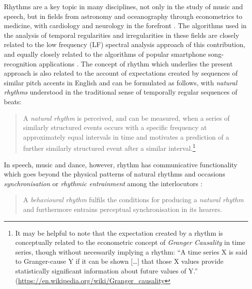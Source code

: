 \documentclass[output=paper,colorlinks,citecolor=brown]{langscibook}
\begin{document}
Rhythms are a key topic in many disciplines, not only in the study of music and speech, but in fields from astronomy and oceanography through econometrics to medicine, with cardiology and neurology in the forefront \citep{lewalterluederitz2010, huangetal1998}. The algorithms used in the analysis of temporal regularities and irregularities in these fields are closely related to the low frequency (LF) spectral analysis approach of this contribution, and equally closely related to the algorithms of popular smartphone song-recognition applications \citep{wangshazam2003}. The concept of rhythm which underlies the present approach is also related to the account of expectations created by sequences of similar pitch accents in English \citep{dilley2005} and can be formulated as follows, with \textit{natural rhythms} understood in the traditional sense of temporally regular sequences of beats:

\begin{quotation}
\noindent A \textit{natural rhythm} is perceived, and can be measured, when a series of similarly structured events occurs with a specific frequency at approximately equal intervals in time and motivates a prediction of a further similarly structured event after a similar interval.\footnote{It may be helpful to note that the expectation created by a rhythm is conceptually related to the econometric concept of \textit{Granger Causality} in time series, though without necessarily implying a rhythm: ``A time series X is said to Granger-cause Y if it can be shown [\ldots] that those X values provide statistically significant information about future values of Y.'' (\url{https://en.wikipedia.org/wiki/Granger_causality}}
\end{quotation}

In speech, music and dance, however, rhythm has communicative functionality which goes beyond the physical patterns of natural rhythms and occasions \textit{synchronisation} or \textit{rhythmic entrainment} among the interlocutors \citep{cumminsport1998, indenmaliszwagnerwachsmuth2012, rathckeetaltapping2021}:

\begin{quotation}
\noindent A \textit{behavioural rhythm} fulfils the conditions for producing a \textit{natural rhythm} and furthermore entrains perceptual synchronisation in its hearers.
\end{quotation}
\end{document}
